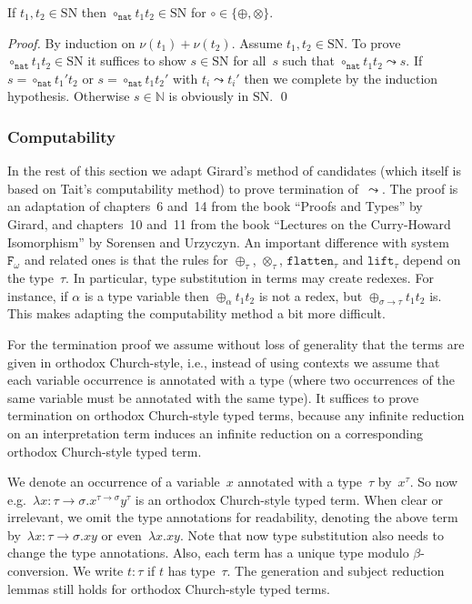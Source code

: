 \documentclass[runningheads,a4paper]{llncs}
\newcommand{\Fomega}{\mathtt{F}_\omega}
\newcommand{\arrtype}{\rightarrow}
\newcommand{\nat}{\mathtt{nat}}
\newcommand{\flatten}{\mathtt{flatten}}
\newcommand{\lift}{\mathtt{lift}}
\newcommand{\SN}{\mathrm{SN}}
\begin{document}
\begin{lemma}\label{lem_circ_sn_base}
  If $t_1,t_2 \in \SN$ then $\circ_\nat t_1 t_2 \in \SN$ for $\circ
  \in \{\oplus,\otimes\}$.
\end{lemma}

\begin{proof}
  By induction on $\nu(t_1) + \nu(t_2)$. Assume $t_1,t_2 \in \SN$. To
  prove $\circ_\nat t_1 t_2 \in \SN$ it suffices to show $s \in \SN$
  for all~$s$ such that $\circ_\nat t_1 t_2 \leadsto s$. If $s =
  \circ_\nat t_1' t_2$ or $s = \circ_\nat t_1 t_2'$ with $t_i \leadsto
  t_i'$ then we complete by the induction hypothesis. Otherwise $s \in
  \mathbb{N}$ is obviously in $\SN$.  \qed
\end{proof}

\subsubsection{Computability}

In the rest of this section we adapt Girard's method of candidates
(which itself is based on Tait's computability method) to prove
termination of~$\leadsto$. The proof is an adaptation of chapters~6
and~14 from the book ``Proofs and Types'' by Girard, and chapters~10
and~11 from the book ``Lectures on the Curry-Howard Isomorphism'' by
Sorensen and Urzyczyn. An important difference with system~$\Fomega$
and related ones is that the rules for $\oplus_\tau$, $\otimes_\tau$,
$\flatten_\tau$ and $\lift_\tau$ depend on the type~$\tau$. In
particular, type substitution in terms may create redexes. For
instance, if $\alpha$ is a type variable then $\oplus_\alpha t_1 t_2$
is not a redex, but $\oplus_{\sigma\arrtype\tau} t_1 t_2$ is. This
makes adapting the computability method a bit more difficult.

For the termination proof we assume without loss of generality that
the terms are given in orthodox Church-style, i.e., instead of using
contexts we assume that each variable occurrence is annotated with a
type (where two occurrences of the same variable must be annotated
with the same type). It suffices to prove termination on orthodox
Church-style typed terms, because any infinite reduction on an
interpretation term induces an infinite reduction on a corresponding
orthodox Church-style typed term.

We denote an occurrence of a variable~$x$ annotated with a type~$\tau$
by~$x^\tau$. So now e.g.~$\lambda x : \tau\arrtype\sigma
. x^{\tau\arrtype\sigma}y^\tau$ is an orthodox Church-style typed
term. When clear or irrelevant, we omit the type annotations for
readability, denoting the above term by~$\lambda x :
\tau\arrtype\sigma . x y$ or even~$\lambda x . x y$. Note that now
type substitution also needs to change the type annotations. Also,
each term has a unique type modulo $\beta$-conversion. We write $t :
\tau$ if $t$ has type~$\tau$. The generation and subject reduction
lemmas still holds for orthodox Church-style typed terms.
\end{document}
